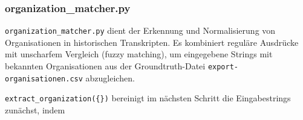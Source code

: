 \documentclass[12pt, a4paper, ngerman, bidi=default]{article}
\newcommand{\code}[1]{\colorbox{VeryLightGray}{\texttt{#1}}} %
\begin{document}
\begin{minipage}[t]{0.38\textwidth}
  \justifying%

\subsubsection{organization\_matcher.py}\label{subsection:organization_matcher}

  \code{organization\_matcher.py} dient der Erkennung und Normalisierung von Organisationen in historischen Transkripten. Es kombiniert reguläre Ausdrücke mit unscharfem Vergleich (fuzzy matching), um eingegebene Strings mit bekannten Organisationen aus der Groundtruth-Datei \texttt{export-organisationen.csv} abzugleichen.

  \noindent \code{extract\_organization(\{\})} bereinigt im nächsten Schritt die Eingabestrings zunächst, indem 
\end{minipage}%
\hfill
\end{document}
